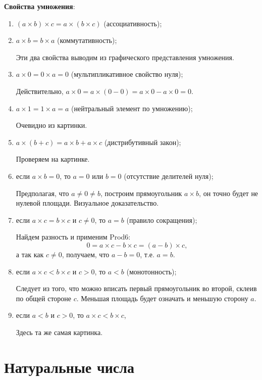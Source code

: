 \textbf{Свойства умножения}:
\begin{enumerate}[label=P\arabic*]
\item $(a\times b)\times c = a\times (b\times c)$ (ассоциативность);
\item $a\times b=b\times a$ (коммутативность);

Эти два свойства выводим из графического представления умножения.

\item $a\times 0=0\times a=0$ (мультипликативное свойство нуля);

Действительно, $a\times 0 = a\times (0-0) = a\times 0 - a\times 0 = 0$.

\item $a\times 1=1\times a=a$ (нейтральный элемент по умножению);

Очевидно из картинки.

\item $a\times(b+c)=a\times b+a\times c$ (дистрибутивный закон);

Проверяем на картинке.
\item если $a\times b=0$, то $a=0$ или $b=0$ (отсутствие делителей нуля);

Предполагая, что $a\ne0\ne b$, построим прямоугольник $a\times b$, он точно будет не нулевой площади. Визуальное доказательство.

\item если $a\times c=b\times c$ и $c\ne 0$, то $a=b$ (правило сокращения);

Найдем разность и применим Prod6:
$$
0 = a\times c-b\times c = (a-b)\times c,
$$
а так как $c\ne 0$, получаем, что $a-b=0$, т.е. $a=b$.

\item если $a\times c<b\times c$ и $c>0$, то $a<b$ (монотонность);

Следует из того, что можно вписать первый прямоугольник во второй, склеив по общей стороне $c$. Меньшая площадь будет означать и меньшую сторону $a$.
\item если $a<b$ и $c>0$, то $a\times c<b\times c$,

Здесь та же самая картинка.
\end{enumerate}


\section{Натуральные числа}


